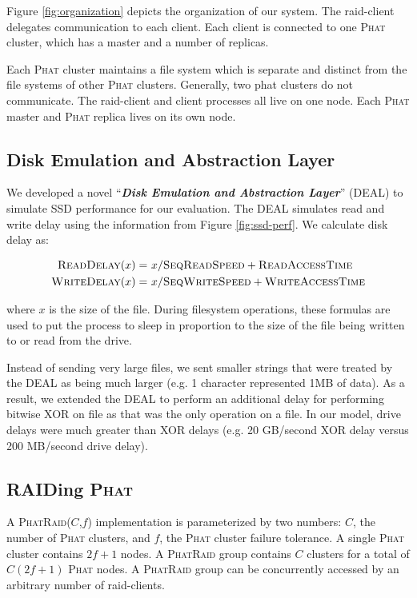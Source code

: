 \documentclass[10pt,letter]{article}
\newcommand{\phat}[0]{\textsc{Phat}}
\newcommand{\phatraid}[0]{\textsc{PhatRaid}}
\newcommand{\phatraidcf}[2]{\textsc{PhatRaid}(#1,#2)}
\begin{document}
Figure \ref{fig:organization} depicts the organization of our system. The
raid-client delegates communication to each client. Each client is connected to
one \phat{} cluster, which has a master and a number of replicas.

Each \phat{} cluster maintains a file system which is separate and distinct from
the file systems of other \phat{} clusters. Generally, two phat clusters do not
communicate. The raid-client and client processes all live on one node. Each
\phat{} master and \phat{} replica lives on its own node.

\subsection{Disk Emulation and Abstraction Layer}

We developed a novel ``{\bf {\em Disk Emulation and Abstraction Layer}}'' (DEAL)
to simulate SSD performance for our evaluation. The DEAL simulates read and 
write delay using the information from Figure \ref{fig:ssd-perf}. We calculate disk delay as:

\begin{align}
\textsc{ReadDelay}(x) =&\ x / \textsc{SeqReadSpeed} + \textsc{ReadAccessTime}\\
\textsc{WriteDelay}(x) =&\ x / \textsc{SeqWriteSpeed} + \textsc{WriteAccessTime}
\end{align}

where $x$ is the size of the file. During filesystem operations, these formulas are
used to put the process to sleep in proportion to the size of the file being written to
or read from the drive. 

Instead of sending very large files, we sent smaller strings that were treated by the 
DEAL as being much larger (e.g. 1 character represented 1MB of data). As a result,
we extended the DEAL to perform an additional delay for performing bitwise XOR
on file as that was the only operation on a file. In our model, drive delays were
much greater than XOR delays (e.g. 20 GB/second XOR delay versus 200 MB/second
drive delay).

\subsection{RAIDing \phat{}}

A \phatraidcf{$C$}{$f$} implementation is parameterized by two numbers: $C$, the
number of \phat{} clusters, and $f$, the \phat{} cluster failure tolerance. A
single \phat{} cluster contains $2f + 1$ nodes. A \phatraid{} group contains $C$
clusters for a total of $C(2f+1)$ \phat{} nodes. A \phatraid{} group can be
concurrently accessed by an arbitrary number of raid-clients.
\end{document}
